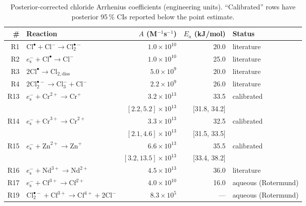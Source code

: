 \documentclass[11pt]{article}
\theoremstyle{plain}
\theoremstyle{definition}
\theoremstyle{remark}
\newcommand{\eS}{\ensuremath{e_{\mathrm{s}}^{-}}\xspace}
\newcommand{\Clt}{\ensuremath{\mathrm{Cl}_2^{\bullet-}}\xspace}
\newcommand{\Ea}{E_a}
\begin{document}
\begin{table}[h!]
\centering
\caption{Posterior-corrected chloride Arrhenius coefficients (engineering
units).  ``Calibrated'' rows have posterior 95\,\% CIs reported below the
point estimate.}
\label{tab:posterior-cl-app}
\small
\begin{tabular}{rlrrl}
\toprule
\# & Reaction & $A$ (M$^{-1}$s$^{-1}$) & $\Ea$ (kJ/mol) & Status \\
\midrule
R1  & $\mathrm{Cl}^{\bullet} + \mathrm{Cl}^- \to \Clt$ & $1.0\!\times\!10^{10}$ & 20.0 & literature \\
R2  & $\eS + \mathrm{Cl}^{\bullet} \to \mathrm{Cl}^-$  & $1.0\!\times\!10^{10}$ & 25.0 & literature \\
R3  & $2\mathrm{Cl}^{\bullet} \to \mathrm{Cl}_{2,\mathrm{diss}}$ & $5.0\!\times\!10^9$ & 20.0 & literature \\
R4  & $2\Clt \to \mathrm{Cl}_3^- + \mathrm{Cl}^-$       & $2.2\!\times\!10^9$    & 26.0 & literature \\
R13 & $\eS + \mathrm{Cr}^{2+} \to \mathrm{Cr}^+$        & $3.2\!\times\!10^{13}$ & 33.5 & calibrated \\
    &                                                   & $[2.2, 5.2]\!\times\!10^{13}$ & [31.8, 34.2] & \\
R14 & $\eS + \mathrm{Cr}^{3+} \to \mathrm{Cr}^{2+}$     & $3.3\!\times\!10^{13}$ & 32.5 & calibrated \\
    &                                                   & $[2.1, 4.6]\!\times\!10^{13}$ & [31.5, 33.5] & \\
R15 & $\eS + \mathrm{Zn}^{2+} \to \mathrm{Zn}^+$        & $6.6\!\times\!10^{13}$ & 35.5 & calibrated \\
    &                                                   & $[3.2, 13.5]\!\times\!10^{13}$ & [33.4, 38.2] & \\
R16 & $\eS + \mathrm{Nd}^{3+} \to \mathrm{Nd}^{2+}$     & $4.5\!\times\!10^{13}$ & 36.0 & literature \\
R17 & $\eS + \mathrm{Cf}^{3+} \to \mathrm{Cf}^{2+}$     & $4.0\!\times\!10^{10}$ & 16.0 & aqueous (Rotermund) \\
R19 & $\Clt + \mathrm{Cf}^{3+} \to \mathrm{Cf}^{4+} + 2\mathrm{Cl}^-$ & $8.3\!\times\!10^5$ & --- & aqueous (Rotermund) \\
\bottomrule
\end{tabular}
\end{table}

\end{document}
